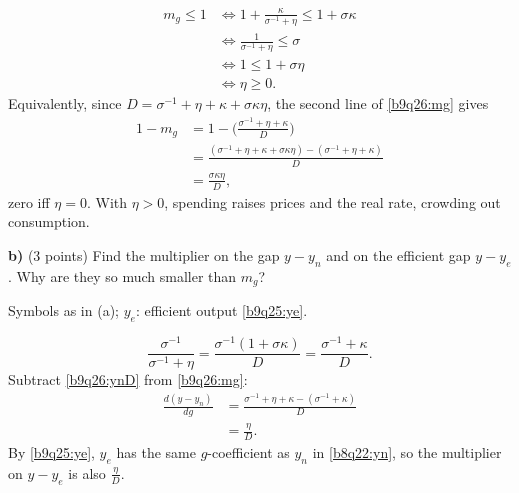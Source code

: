 \begin{sol}
\begin{align*}
m_g\le1&\iff1+\frac{\kappa}{\sigma^{-1}+\eta}\le1+\sigma\kappa\\
&\iff\frac1{\sigma^{-1}+\eta}\le\sigma\\
&\iff1\le1+\sigma\eta\\
&\iff\eta\ge0 .
\end{align*}
Equivalently, since $D=\sigma^{-1}+\eta+\kappa+\sigma\kappa\eta$, the second line of \eqref{b9q26:mg} gives
\begin{align}
1-m_g&=1-\Big(\frac{\sigma^{-1}+\eta+\kappa}{D}\Big)\nonumber\\
&=\frac{(\sigma^{-1}+\eta+\kappa+\sigma\kappa\eta)-(\sigma^{-1}+\eta+\kappa)}{D}\nonumber\\
&=\frac{\sigma\kappa\eta}{D}, \label{b9q26:1mg}
\end{align}
zero iff $\eta=0$. With $\eta>0$, spending raises prices and the real rate, crowding out consumption.
\end{sol}

\textbf{b)} (3 points) Find the multiplier on the gap $y-y_n$ and on the efficient gap $y-y_e$. Why are they so much smaller than $m_g$?
\resolespaco
\begin{sol}
\begin{notacao}
\item Symbols as in (a); $y_e$: efficient output \eqref{b9q25:ye}.
\end{notacao}
\begin{equation}
\frac{\sigma^{-1}}{\sigma^{-1}+\eta}=\frac{\sigma^{-1}(1+\sigma\kappa)}{D}=\frac{\sigma^{-1}+\kappa}{D}. \label{b9q26:ynD}
\end{equation}
Subtract \eqref{b9q26:ynD} from \eqref{b9q26:mg}:
\begin{align}
\frac{d(y-y_n)}{dg}&=\frac{\sigma^{-1}+\eta+\kappa-(\sigma^{-1}+\kappa)}{D}\nonumber\\
&=\frac{\eta}{D}. \label{b9q26:gapm}
\end{align}
By \eqref{b9q25:ye}, $y_e$ has the same $g$-coefficient as $y_n$ in \eqref{b8q22:yn}, so the multiplier on $y-y_e$ is also $\frac\eta D$.
\end{sol}

